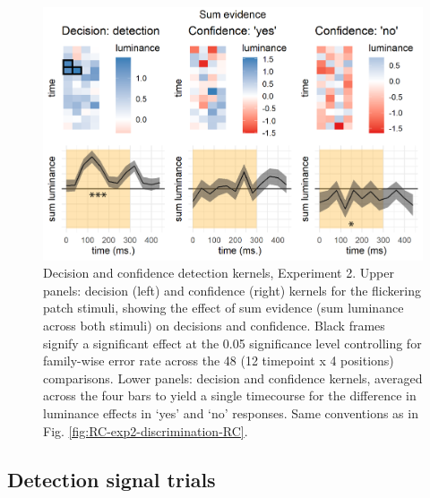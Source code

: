 \documentclass[12pt,twoside]{reedthesis}
\begin{document}
\begin{figure}
\includegraphics[width=\textwidth]{figure/RC/RC-exp2-detection-RC-enhanced} \caption[Decision kernels in detection, Exp. 2]{Decision and confidence detection kernels, Experiment 2. Upper panels: decision (left) and confidence (right) kernels for the flickering patch stimuli, showing the effect of sum evidence (sum luminance across both stimuli) on decisions and confidence. Black frames signify a significant effect at the 0.05 significance level controlling for family-wise error rate across the 48 (12 timepoint x 4 positions) comparisons. Lower panels: decision and confidence kernels, averaged across the four bars to yield a single timecourse for the difference in luminance effects in `yes' and `no' responses. Same conventions as in Fig. \ref{fig:RC-exp2-discrimination-RC}.}\label{fig:RC-exp2-detection-RC-figure}
\end{figure}
\hypertarget{detection-signal-trials-1}{%
\subsection{Detection signal trials}\label{detection-signal-trials-1}}
\end{document}

